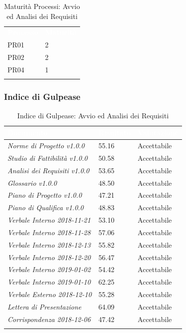 \begin{longtable}{|C{.47\textwidth}|C{.47\textwidth}|}
\hline
{}\textbf{\textcolor{white}{Processo}} & \textbf{\textcolor{white}{Maturità}}\\
PR01 & 2\\ 
\hline
{}PR02 & 2 \\
\hline
PR04 & 1 \\ 
\hline 
\caption{Maturità Processi: Avvio ed Analisi dei Requisiti}
\label{mat:aar}
\end{longtable}


\subsubsection{Indice di Gulpease}


\begin{longtable}{|C{.47\textwidth}|C{.22\textwidth}|C{.22\textwidth}|}
\hline
{}\textbf{\textcolor{white}{Documento}} & \textbf{\textcolor{white}{Risultato}} & \textbf{\textcolor{white}{Valutazione}}\\
\endhead
\textit{Norme di Progetto v1.0.0} & 55.16 & Accettabile \\
\hline
{}\textit{Studio di Fattibilità v1.0.0} & 50.58 & Accettabile\\
\hline
\textit{Analisi dei Requisiti v1.0.0} & 53.65 & Accettabile \\
\hline
{}\textit{Glossario v1.0.0} & 48.50 & Accettabile\\
\hline
\textit{Piano di Progetto v1.0.0} & 47.21 & Accettabile \\
\hline
{}\textit{Piano di Qualifica v1.0.0} & 48.83 & Accettabile\\

\hline
\textit{Verbale Interno 2018-11-21} & 53.10 & Accettabile\\
\hline
{}\textit{Verbale Interno 2018-11-28} & 57.06 & Accettabile\\
\hline
\textit{Verbale Interno 2018-12-13} & 55.82 & Accettabile\\
\hline
{}\textit{Verbale Interno 2018-12-20} & 56.47 & Accettabile \\
\hline
\textit{Verbale Interno 2019-01-02} & 54.42 & Accettabile \\
\hline
{}\textit{Verbale Interno 2019-01-10} & 62.25 & Accettabile\\
\hline
\textit{Verbale Esterno 2018-12-10} & 55.28 & Accettabile\\
\hline
{}\textit{Lettera di Presentazione} & 64.09 & Accettabile\\
\hline
\textit{Corrispondenza 2018-12-06} & 47.42 & Accettabile\\
\hline

\caption{Indice di Gulpease: Avvio ed Analisi dei Requisiti}
\label{gulp:aar}
\end{longtable}


